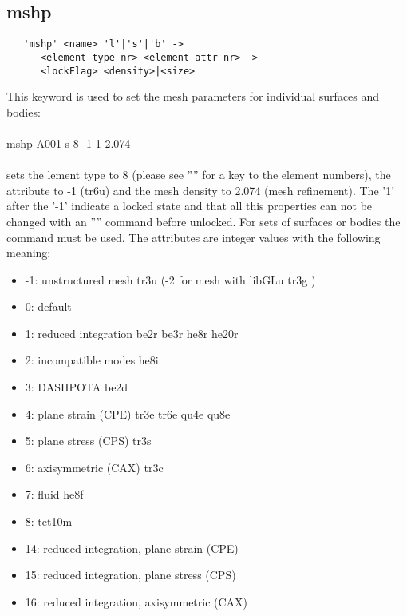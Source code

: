 \documentclass{article}
\begin{document}
\subsection{\label{mshp}mshp}
\begin{verbatim}
   'mshp' <name> 'l'|'s'|'b' ->
      <element-type-nr> <element-attr-nr> ->
      <lockFlag> <density>|<size>
\end{verbatim}
This keyword is used to set the mesh parameters for individual surfaces and bodies:\\\\mshp A001 s 8 -1 1 2.074\\\\sets the lement type to 8 (please see '''' for a key to the element numbers), the attribute to -1 (tr6u) and the mesh density to 2.074 (mesh refinement). The '1' after the '-1' indicate a locked state and that all this properties can not be changed with an '''' command before unlocked. For sets of surfaces or bodies the  command must be used. The attributes are integer values with the following meaning:
\begin{itemize}
\item  -1: unstructured mesh tr3u (-2 for mesh with libGLu tr3g )
\item   0: default
\item   1: reduced integration be2r be3r he8r he20r
\item   2: incompatible modes he8i
\item   3: DASHPOTA be2d
\item   4: plane strain (CPE) tr3e tr6e qu4e qu8e
\item   5: plane stress (CPS) tr3s
\item   6: axisymmetric  (CAX) tr3c
\item   7: fluid he8f
\item   8: tet10m
\item   14: reduced integration, plane strain (CPE)
\item   15: reduced integration, plane stress (CPS)
\item   16: reduced integration, axisymmetric  (CAX)
\end{itemize}
 
\end{document}

